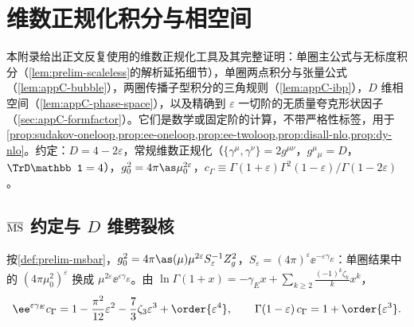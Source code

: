 \chapter{维数正规化积分与相空间}\label{app:appC}

本附录给出正文反复使用的维数正规化工具及其完整证明：单圈主公式与无标度积分（\cref{lem:prelim-scaleless}的解析延拓细节），单圈两点积分与张量公式（\cref{lem:appC-bubble}），两圈传播子型积分的三角规则（\cref{lem:appC-ibp}），$D$ 维相空间（\cref{lem:appC-phase-space}），以及精确到 $\varepsilon$ 一切阶的无质量夸克形状因子（\cref{sec:appC-formfactor}）。它们是数学或固定阶的计算，不带严格性标签，用于\cref{prop:sudakov-oneloop,prop:ee-oneloop,prop:ee-twoloop,prop:disall-nlo,prop:dy-nlo}。约定：$D=4-2\varepsilon$，常规维数正规化（$\{\gamma^\mu,\gamma^\nu\}=2g^{\mu\nu}$，$g^\mu{}_\mu=D$，$\TrD\mathbb 1=4$），$g_0^2=4\pi\as\mu_0^{2\varepsilon}$，$c_\Gamma\equiv\Gamma(1+\varepsilon)\Gamma^2(1-\varepsilon)/\Gamma(1-2\varepsilon)$。

\section{$\overline{\rm MS}$ 约定与 $D$ 维劈裂核}\label{sec:appC-msbar}

按\cref{def:prelim-msbar}，$g_0^2=4\pi\as(\mu)\mu^{2\varepsilon}S_\varepsilon^{-1}Z_g^2$，$S_\varepsilon=(4\pi)^\varepsilon\ee^{-\varepsilon\gamma_E}$：单圈结果中的 $(4\pi\mu_0^2)^\varepsilon$ 换成 $\mu^{2\varepsilon}\ee^{\varepsilon\gamma_E}$。由 $\ln\Gamma(1+x)=-\gamma_Ex+\sum_{k\ge2}\frac{(-1)^k\zeta_k}kx^k$，
\begin{equation}\label{eq:appC-expansions}
\ee^{\varepsilon\gamma_E}c_\Gamma=1-\frac{\pi^2}{12}\varepsilon^2-\frac73\zeta_3\varepsilon^3+\order{\varepsilon^4},\qquad
\Gamma(1-\varepsilon)\,c_\Gamma=1+\order{\varepsilon^3}.
\end{equation}

